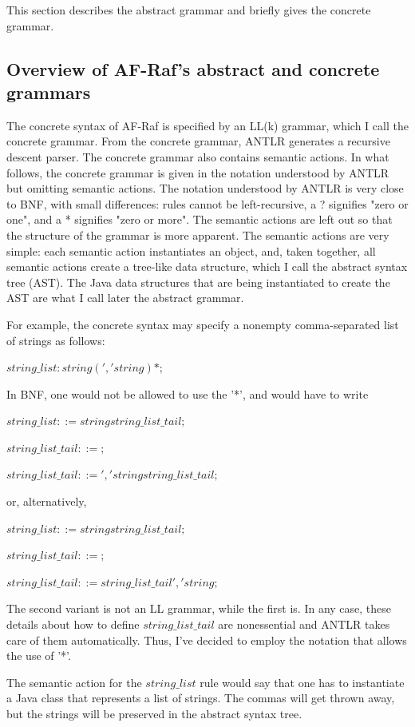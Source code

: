 \documentclass[a4paper,12pt,oneside,fleqn]{book} %
\begin{document}
This section describes the abstract grammar and briefly gives the concrete
grammar.

\subsection{Overview of AF-Raf's abstract and concrete grammars} %
The concrete syntax of AF-Raf is specified by an LL(k) grammar, which I call
the concrete grammar. From the concrete grammar, ANTLR generates a
recursive descent parser. The concrete grammar also contains semantic
actions. In what follows, the concrete grammar is given in the notation
understood by ANTLR but omitting semantic actions. The notation understood
by ANTLR is very close to BNF, with small differences: rules cannot be
left-recursive, a ? signifies "zero or one", and a * signifies "zero or
more". The semantic actions are left out so that the structure of the
grammar is more apparent. The semantic actions are very simple: each
semantic action instantiates an object, and, taken together, all semantic
actions create a tree-like data structure, which I call the abstract syntax
tree (AST). The Java data structures that are being instantiated to create
the AST are what I call later the abstract grammar.

For example, the concrete syntax may specify a nonempty comma-separated
list of strings as follows:

$string\_list: string (',' string)*;$

In BNF, one would not be allowed to use the '*', and would have to write

$string\_list ::= string string\_list\_tail;$

$string\_list\_tail ::= ;$

$string\_list\_tail ::= ',' string string\_list\_tail;$

or, alternatively,

$string\_list ::= string string\_list\_tail;$

$string\_list\_tail ::= ;$

$string\_list\_tail ::= string\_list\_tail ',' string;$

The second variant is not an LL grammar, while the first is. In any case,
these details about how to define $string\_list\_tail$ are nonessential and
ANTLR takes care of them automatically. Thus, I've decided to employ the
notation that allows the use of '*'.

The semantic action for the $string\_list$ rule would say that one has to
instantiate a Java class that represents a list of strings. The commas will
get thrown away, but the strings will be preserved in the abstract syntax
tree.
\end{document}
